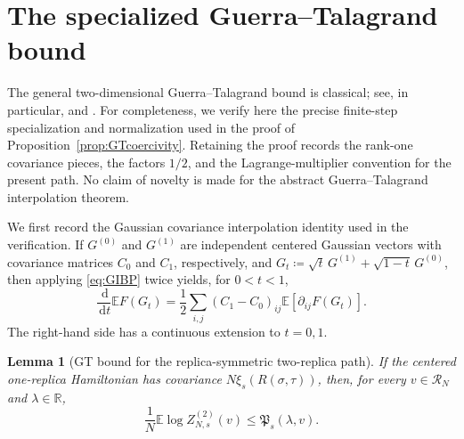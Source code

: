 \documentclass[11pt]{article}
\newtheorem{lemma}[theorem]{Lemma}
\numberwithin{equation}{section}
\newcommand{\E}{\mathbb{E}}
\newcommand{\1}{\mathbf 1}
\newcommand{\dd}{\,\mathrm d}
\begin{document}
\appendix

\section{The specialized Guerra--Talagrand bound}
\label{app:specialGT}

The general two-dimensional Guerra--Talagrand bound is classical; see,
in particular, \cite{ChenGT} and \cite{Talagrand}.  For completeness, we
verify here the precise finite-step specialization and normalization
used in the proof of Proposition~\ref{prop:GTcoercivity}.  Retaining the
proof records the rank-one covariance pieces, the factors $1/2$, and
the Lagrange-multiplier convention for the present path.  No claim of
novelty is made for the abstract Guerra--Talagrand interpolation theorem.

We first record the Gaussian covariance interpolation identity used in
the verification.  If $G^{(0)}$ and $G^{(1)}$ are independent centered
Gaussian vectors with covariance matrices $C_0$ and $C_1$, respectively,
and $G_t\coloneqq\sqrt t\,G^{(1)}+\sqrt{1-t}\,G^{(0)}$, then applying
\eqref{eq:GIBP} twice yields, for $0<t<1$,
\begin{equation}
 \frac{\dd}{\dd t}\E F(G_t)
 =\frac12\sum_{i,j}(C_1-C_0)_{ij}
   \E[\partial_{ij}F(G_t)].
 \label{eq:gaussianinterpolation}
\end{equation}
The right-hand side has a continuous extension to $t=0,1$.

\begin{lemma}[GT bound for the replica-symmetric two-replica path]
\label{lem:specialGT}
If the centered one-replica Hamiltonian has covariance
$N\xi_s(R(\sigma,\tau))$, then, for every $v\in\mathcal R_N$ and
$\lambda\in\mathbb R$,
\begin{equation}
 \frac1N\E\log Z^{(2)}_{N,s}(v)
 \le \mathfrak P_s(\lambda,v).
 \label{eq:specialGTlemma}
\end{equation}
\end{lemma}
\end{document}
